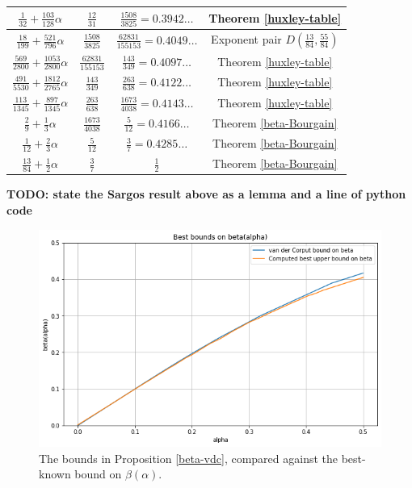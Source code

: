 \begin{table}[ht]
\begin{tabular}{|c|c|c|c|}
    \hline
    $ \frac{1}{32} + \frac{103}{128} \alpha $ & $ \frac{12}{31} $ & $ \frac{1508}{3825} = 0.3942\ldots $ & Theorem \ref{huxley-table}\\
    \hline
    $ \frac{18}{199} + \frac{521}{796} \alpha $ & $ \frac{1508}{3825} $ & $ \frac{62831}{155153} = 0.4049\ldots $ & Exponent pair $D(\frac{13}{84}, \frac{55}{84})$\\
    \hline
    $ \frac{569}{2800} + \frac{1053}{2800} \alpha $ & $ \frac{62831}{155153} $ & $ \frac{143}{349} = 0.4097\ldots $ & Theorem \ref{huxley-table}\\
    \hline
    $ \frac{491}{5530} + \frac{1812}{2765} \alpha $ & $ \frac{143}{349} $ & $ \frac{263}{638} = 0.4122\ldots $ & Theorem \ref{huxley-table}\\
    \hline
    $ \frac{113}{1345} + \frac{897}{1345} \alpha $ & $ \frac{263}{638} $ & $ \frac{1673}{4038} = 0.4143\ldots $ &Theorem \ref{huxley-table}\\
    \hline
    $ \frac{2}{9} + \frac{1}{3} \alpha $ & $ \frac{1673}{4038} $ & $ \frac{5}{12} = 0.4166\ldots $ & Theorem \ref{beta-Bourgain}\\
    \hline
    $ \frac{1}{12} + \frac{2}{3} \alpha $ & $ \frac{5}{12} $ & $ \frac{3}{7} = 0.4285\ldots $ & Theorem \ref{beta-Bourgain}\\
    \hline
    $ \frac{13}{84} + \frac{1}{2} \alpha $ & $ \frac{3}{7} $ & $ \frac{1}{2}$ & Theorem \ref{beta-Bourgain}\\
    \hline
    \end{tabular}
    \label{huxley_table_ranges}
    \end{table}
    
\literature
{}

{\bf TODO: state the Sargos result above as a lemma and a line of python code}

\begin{figure}
    \centering
    \includegraphics[width=0.5\linewidth]{chapter/van_der_corput_vs_best_beta.png}
    \caption{The bounds in Proposition \ref{beta-vdc}, compared against the best-known bound on $\beta(\alpha)$.}
    \label{fig:vdc}
\end{figure}
